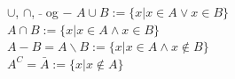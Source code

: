 \begin{frame}{$\cup$, $\cap$, $\bar{}$ og $-$}
    $A \cup B := \{x | x \in A \lor x \in B\}$ \\
    $A \cap B := \{x | x \in A \land x \in B\}$\\
    $A - B = A \backslash B := \{x | x \in A\land  x \notin B\}$\\
    $A^C = \bar{A} := \{x | x \notin A\}$
    
    \pause
    \begin{figure}%
        \centering
        \qquad
        \qquad
        \qquad
        \label{fig:example2}%
    \end{figure}
\end{frame}

